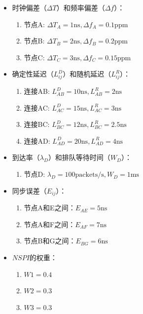 \documentclass[UTF8,a4paper,12pt]{ctexart}
\numberwithin{equation}{section}
\begin{document}
\begin{itemize}
	\item 时钟偏差（$\Delta T$）和频率偏差（$\Delta f$）：
	\begin{enumerate}
		\item 节点A: $\Delta T_A = 1 \text{ns}, \Delta f_A = 0.1 \text{ppm}$
		\item 节点B: $\Delta T_B = 2 \text{ns}, \Delta f_B = 0.2 \text{ppm}$
		\item 节点C: $\Delta T_C = 3 \text{ns}, \Delta f_C = 0.15 \text{ppm}$
	\end{enumerate}
	
	\item 确定性延迟（$L_{ij}^D$）和随机延迟（$L_{ij}^R$）：
	\begin{enumerate}
		\item 连接AB: $L_{AB}^D = 10 \text{ns}, L_{AB}^R = 2 \text{ns}$
		\item 连接AC: $L_{AC}^D = 15 \text{ns}, L_{AC}^R = 3 \text{ns}$
		\item 连接BC: $L_{BC}^D = 12 \text{ns}, L_{BC}^R = 2.5 \text{ns}$
		\item 连接AD: $L_{AD}^D = 20 \text{ns}, L_{AD}^R = 4 \text{ns}$
	\end{enumerate}
	
	\item 到达率（$\lambda_D$）和排队等待时间（$W_D$）：
	\begin{enumerate}
		\item 节点D: $\lambda_D = 100 \text{packets/s}, W_D = 1 \text{ms}$
	\end{enumerate}
	
	\item 同步误差（$E_{ij}$）：
	\begin{enumerate}
		\item 节点A和E之间：$E_{AE} = 5 \text{ns}$
		\item 节点A和F之间：$E_{AF} = 7 \text{ns}$
		\item 节点B和G之间：$E_{BG} = 6 \text{ns}$
	\end{enumerate}
	
	\item $NSPI$的权重：
	\begin{enumerate}
		\item $W1 = 0.4$
		\item $W2 = 0.3$
		\item $W3 = 0.3$
	\end{enumerate}
\end{itemize}
\end{document}
